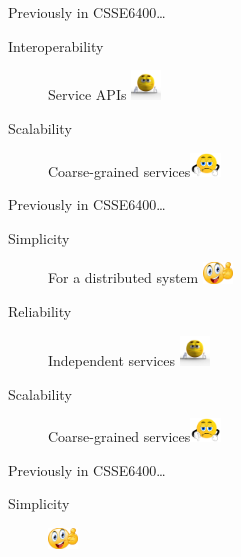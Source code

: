 \documentclass{slide}
\begin{document}
\begin{frame}{Previously in CSSE6400\dots}
{\begin{description}
        \item[Interoperability] Service APIs \tabto{15em}\includegraphics[trim=57 145 70 85,clip,width=8mm]{../../shared/images/neutral.png}
        \item[Scalability] Coarse-grained services\tabto{15em}\includegraphics[trim=22 19 22 12,clip,width=8mm]{../../shared/images/thumbs-down.png}
    \end{description}
    }
\end{frame}


\begin{frame}{Previously in CSSE6400\dots}
    \vspace{1mm}
    {\LARGE
    \begin{description}
        \item[Simplicity] For a distributed system \tabto{15em}\includegraphics[width=8mm]{../../shared/images/thumbs-up.png}
        \item[Reliability] Independent services \tabto{15em}\includegraphics[trim=57 145 70 85,clip,width=8mm]{../../shared/images/neutral.png}
        \item[Scalability] Coarse-grained services\tabto{15em}\includegraphics[trim=22 19 22 12,clip,width=8mm]{../../shared/images/thumbs-down.png}
    \end{description}
    }
\end{frame}


\begin{frame}{Previously in CSSE6400\dots}
    \vspace{1mm}
    {\LARGE
    \begin{description}
        \item[Simplicity]  \tabto{15em}\includegraphics[width=8mm]{../../shared/images/thumbs-up.png}
    \end{description}
    }
\end{frame}
\end{document}
